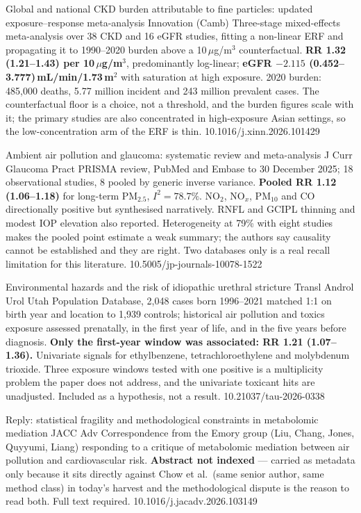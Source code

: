 \documentclass[10pt]{article}
\begin{document}
{Global and national CKD burden attributable to fine particles: updated exposure--response meta-analysis}
{Innovation (Camb)}
{Three-stage mixed-effects meta-analysis over 38 CKD and 16 eGFR studies, fitting a
non-linear ERF and propagating it to 1990--2020 burden above a 10\,$\mu$g/m$^3$
counterfactual. \textbf{RR 1.32 (1.21--1.43) per 10\,$\mu$g/m$^3$}, predominantly
log-linear; \textbf{eGFR $-2.115$ (0.452--3.777)\,mL/min/1.73\,m$^2$} with saturation at
high exposure. 2020 burden: 485{,}000 deaths, 5.77 million incident and 243 million
prevalent cases. The counterfactual floor is a choice, not a threshold, and the burden
figures scale with it; the primary studies are also concentrated in high-exposure Asian
settings, so the low-concentration arm of the ERF is thin.}
{10.1016/j.xinn.2026.101429}

{Ambient air pollution and glaucoma: systematic review and meta-analysis}
{J Curr Glaucoma Pract}
{PRISMA review, PubMed and Embase to 30 December 2025; 18 observational studies, 8
pooled by generic inverse variance. \textbf{Pooled RR 1.12 (1.06--1.18)} for long-term
PM$_{2.5}$, $I^2=78.7\%$. NO$_2$, NO$_x$, PM$_{10}$ and CO directionally positive but
synthesised narratively. RNFL and GCIPL thinning and modest IOP elevation also reported.
Heterogeneity at 79\% with eight studies makes the pooled point estimate a weak summary;
the authors say causality cannot be established and they are right. Two databases only
is a real recall limitation for this literature.}
{10.5005/jp-journals-10078-1522}

{Environmental hazards and the risk of idiopathic urethral stricture}
{Transl Androl Urol}
{Utah Population Database, 2{,}048 cases born 1996--2021 matched 1:1 on birth year and
location to 1{,}939 controls; historical air pollution and toxics exposure assessed
prenatally, in the first year of life, and in the five years before diagnosis.
\textbf{Only the first-year window was associated: RR 1.21 (1.07--1.36).} Univariate
signals for ethylbenzene, tetrachloroethylene and molybdenum trioxide. Three exposure
windows tested with one positive is a multiplicity problem the paper does not address,
and the univariate toxicant hits are unadjusted. Included as a hypothesis, not a result.}
{10.21037/tau-2026-0338}

{Reply: statistical fragility and methodological constraints in metabolomic mediation}
{JACC Adv}
{Correspondence from the Emory group (Liu, Chang, Jones, Quyyumi, Liang) responding to a
critique of metabolomic mediation between air pollution and cardiovascular risk.
\textbf{Abstract not indexed} --- carried as metadata only because it sits directly
against Chow et al.\ (same senior author, same method class) in today's harvest and the
methodological dispute is the reason to read both. Full text required.}
{10.1016/j.jacadv.2026.103149}
\end{document}
